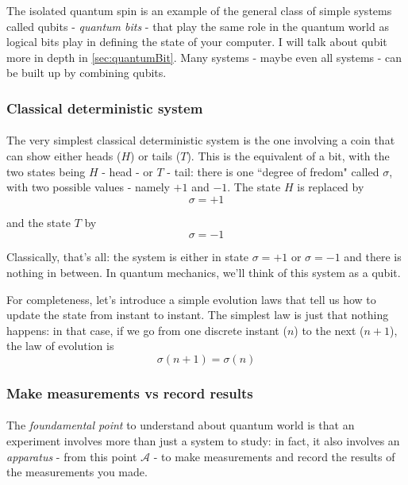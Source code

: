 \documentclass[a4paper,10pt]{article}
\begin{document}
The isolated quantum spin is an example of the general class of simple systems called qubits - \textit{quantum bits} - that play the same role in the quantum world as logical bits play in defining the state of your computer. I will talk about qubit more in depth in \autoref{sec:quantumBit}. Many systems - maybe even all systems - can be built up by combining qubits.

\subsubsection{Classical deterministic system}

\paragraph{} The very simplest classical deterministic system is the one involving a coin that can show either heads ($H$) or tails ($T$). This is the equivalent of a bit, with the two states being $H$ - head - or $T$ - tail: there is one ``degree of fredom" called $\sigma$, with two possible values - namely $+1$ and $-1$. The state $H$ is replaced by
$$\sigma = +1$$

and the state $T$ by
$$\sigma = -1$$

Classically, that's all: the system is either in state $\sigma = +1$ or $\sigma = -1$ and there is nothing in between. In quantum mechanics, we'll think of this system as a qubit.

For completeness, let's introduce a simple evolution laws that tell us how to update the state from instant to instant. The simplest law is just that nothing happens: in that case, if we go from one discrete instant ($n$) to the next ($n+1$), the law of evolution is
\begin{equation*}
\sigma(n + 1) = \sigma(n)
\end{equation*}

\subsubsection{Make measurements vs record results}

\paragraph{} The \textit{foundamental point} to understand about quantum world is that an experiment involves more than just a system to study: in fact, it also involves an \textit{apparatus} - from this point $\mathcal{A}$ - to make measurements and record the results of the measurements you made.
\end{document}
